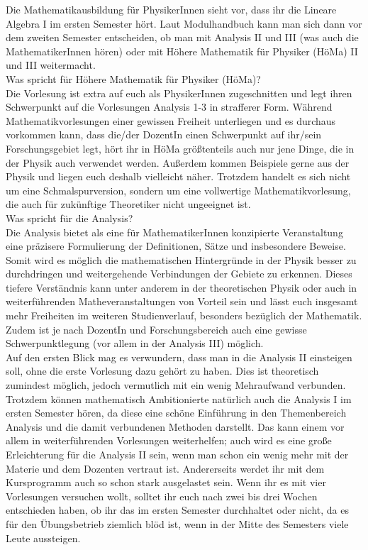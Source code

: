 \label{mathephysik}

Die Mathematikausbildung für PhysikerInnen sieht vor, dass ihr die Lineare Algebra I im ersten Semester hört. Laut Modulhandbuch kann man sich dann vor dem zweiten Semester entscheiden, ob man mit Analysis II und III (was auch die MathematikerInnen hören) oder mit Höhere Mathematik für Physiker (HöMa) II und III weitermacht.\\

Was spricht für Höhere Mathematik für Physiker (HöMa)?\\
Die Vorlesung ist extra auf euch als PhysikerInnen zugeschnitten und legt ihren Schwerpunkt auf die Vorlesungen Analysis 1-3 in strafferer Form. Während Mathematikvorlesungen einer gewissen Freiheit unterliegen und es durchaus vorkommen kann, dass die/der DozentIn einen Schwerpunkt auf ihr/sein Forschungsgebiet legt, hört ihr in HöMa größtenteils auch nur jene Dinge, die in der Physik auch verwendet werden. Außerdem kommen Beispiele gerne aus der Physik und liegen euch deshalb vielleicht näher. Trotzdem handelt es sich nicht um eine Schmalspurversion, sondern um eine vollwertige Mathematikvorlesung, die auch für zukünftige Theoretiker nicht ungeeignet ist.\\

Was spricht für die Analysis?\\
Die Analysis bietet als eine für MathematikerInnen konzipierte Veranstaltung eine präzisere Formulierung der Definitionen, Sätze und insbesondere Beweise. Somit wird es möglich die mathematischen Hintergründe in der Physik besser zu durchdringen und weitergehende Verbindungen der Gebiete zu erkennen. Dieses tiefere Verständnis kann unter anderem in der theoretischen Physik oder auch in weiterführenden Matheveranstaltungen von Vorteil sein und lässt euch insgesamt mehr Freiheiten im weiteren Studienverlauf, besonders bezüglich der Mathematik. Zudem ist je nach DozentIn und Forschungsbereich auch eine gewisse Schwerpunktlegung (vor allem in der Analysis III) möglich.\\

Auf den ersten Blick mag es verwundern, dass man in die Analysis II einsteigen soll, ohne die erste Vorlesung dazu gehört zu haben. Dies ist theoretisch zumindest möglich, jedoch vermutlich mit ein wenig Mehraufwand verbunden. Trotzdem können mathematisch Ambitionierte natürlich auch die Analysis I im ersten Semester hören, da diese eine schöne Einführung in den Themenbereich Analysis und die damit verbundenen Methoden darstellt. Das kann einem vor allem in weiterführenden Vorlesungen weiterhelfen; auch wird es eine große Erleichterung für die Analysis II sein, wenn man schon ein wenig mehr mit der Materie und dem Dozenten vertraut ist. Andererseits werdet ihr mit dem Kursprogramm auch so schon stark ausgelastet sein. Wenn ihr es mit vier Vorlesungen versuchen wollt, solltet ihr euch nach zwei bis drei Wochen entschieden haben, ob ihr das im ersten Semester durchhaltet oder nicht, da es für den Übungsbetrieb ziemlich blöd ist, wenn in der Mitte des Semesters viele Leute aussteigen.
